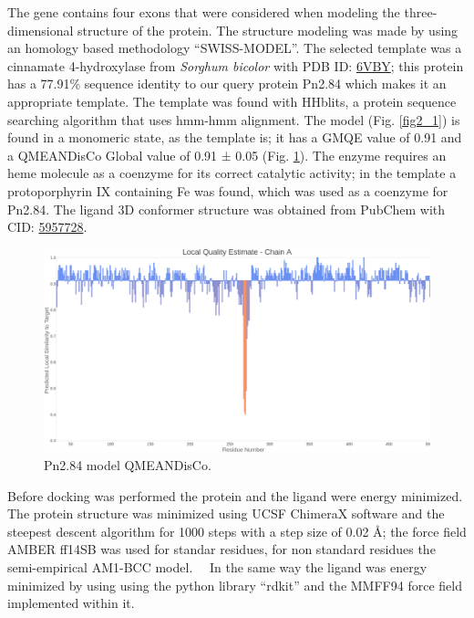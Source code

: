 \documentclass[12pt]{article}
\begin{document}
	The gene contains four exons that were considered when modeling the three-dimensional structure of the protein. The structure modeling was made by using an homology based methodology ``SWISS-MODEL''. \cite{swiss} The selected template was a cinnamate 4-hydroxylase from \textit{Sorghum bicolor} with PDB ID: \href{https://www.rcsb.org/structure/6VBY}{6VBY}; this protein has a 77.91\% sequence identity to our query protein Pn2.84 which makes it an appropriate template. The template was found with HHblits, a protein sequence searching algorithm that uses hmm-hmm alignment. \cite{hhblits} The model (Fig. \ref{fig2_1}) is found in a monomeric state, as the template is; it has a GMQE value of 0.91 and a QMEANDisCo Global value of 0.91 ± 0.05 (Fig. \ref{fig2_2}). \cite{qmeandisco_swiss} The enzyme requires an heme molecule as a coenzyme for its correct catalytic activity; in the template a protoporphyrin IX containing Fe was found, which was used as a coenzyme for Pn2.84. The ligand 3D conformer structure was obtained from PubChem with CID: \href{https://pubchem.ncbi.nlm.nih.gov/compound/5957728}{5957728}.
	
	
	\FloatBarrier
	\begin{figure}[h!]
		\centering
		\includegraphics[width=\textwidth-50pt]{../2/Swiss/Local_quality_estimate.png}
		\caption{Pn2.84 model QMEANDisCo.}
		\label{fig2_2}
	\end{figure}
	\FloatBarrier
	
	Before docking was performed the protein and the ligand were energy minimized. The protein structure was minimized using UCSF ChimeraX software \cite{chimera,chimera_2} and the steepest descent algorithm for 1000 steps with a step size of 0.02 \r{A}; the force field AMBER ff14SB was used for standar residues, for non standard residues the semi-empirical AM1-BCC model. \cite{am1_bcc,am1_bcc_2,am1_bcc_3}\ \ In the same way the ligand was energy minimized by using using the python library ``rdkit'' and the MMFF94 force field implemented within it. \cite{rdkit,rdkit_mmff}
	
\end{document}
